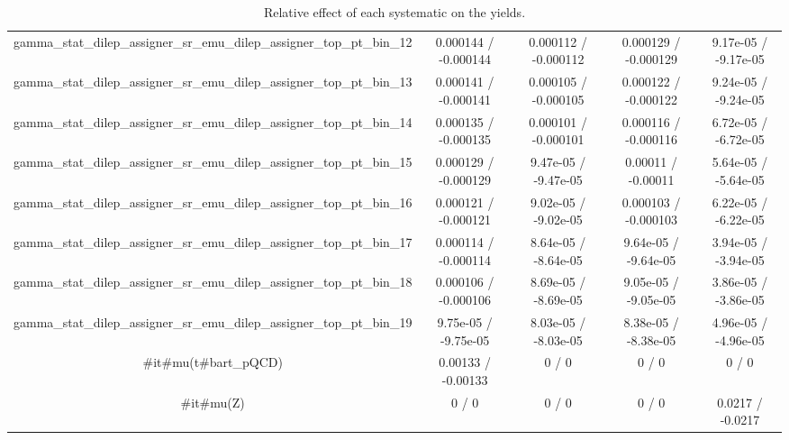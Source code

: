 \documentclass[10pt]{article}
\begin{document}
\begin{table}[htbp]
\begin{center}
\begin{tabular}{|c|c|c|c|c|}
  gamma_stat_dilep_assigner_sr_emu_dilep_assigner_top_pt_bin_12 & 0.000144 / -0.000144 & 0.000112 / -0.000112 & 0.000129 / -0.000129 & 9.17e-05 / -9.17e-05 \\ 
  gamma_stat_dilep_assigner_sr_emu_dilep_assigner_top_pt_bin_13 & 0.000141 / -0.000141 & 0.000105 / -0.000105 & 0.000122 / -0.000122 & 9.24e-05 / -9.24e-05 \\ 
  gamma_stat_dilep_assigner_sr_emu_dilep_assigner_top_pt_bin_14 & 0.000135 / -0.000135 & 0.000101 / -0.000101 & 0.000116 / -0.000116 & 6.72e-05 / -6.72e-05 \\ 
  gamma_stat_dilep_assigner_sr_emu_dilep_assigner_top_pt_bin_15 & 0.000129 / -0.000129 & 9.47e-05 / -9.47e-05 & 0.00011 / -0.00011 & 5.64e-05 / -5.64e-05 \\ 
  gamma_stat_dilep_assigner_sr_emu_dilep_assigner_top_pt_bin_16 & 0.000121 / -0.000121 & 9.02e-05 / -9.02e-05 & 0.000103 / -0.000103 & 6.22e-05 / -6.22e-05 \\ 
  gamma_stat_dilep_assigner_sr_emu_dilep_assigner_top_pt_bin_17 & 0.000114 / -0.000114 & 8.64e-05 / -8.64e-05 & 9.64e-05 / -9.64e-05 & 3.94e-05 / -3.94e-05 \\ 
  gamma_stat_dilep_assigner_sr_emu_dilep_assigner_top_pt_bin_18 & 0.000106 / -0.000106 & 8.69e-05 / -8.69e-05 & 9.05e-05 / -9.05e-05 & 3.86e-05 / -3.86e-05 \\ 
  gamma_stat_dilep_assigner_sr_emu_dilep_assigner_top_pt_bin_19 & 9.75e-05 / -9.75e-05 & 8.03e-05 / -8.03e-05 & 8.38e-05 / -8.38e-05 & 4.96e-05 / -4.96e-05 \\ 
  #it{#mu}(t#bar{t}_{pQCD}) & 0.00133 / -0.00133 & 0 / 0 & 0 / 0 & 0 / 0 \\ 
  #it{#mu}(Z) & 0 / 0 & 0 / 0 & 0 / 0 & 0.0217 / -0.0217 \\ 
\hline 
\end{tabular} 
\caption{Relative effect of each systematic on the yields.} 
\end{center} 
\end{table} 
\end{document}
